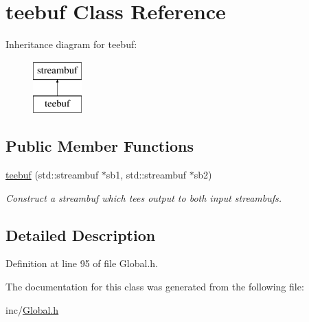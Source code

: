 \hypertarget{classteebuf}{}\section{teebuf Class Reference}
\label{classteebuf}
Inheritance diagram for teebuf\+:\begin{figure}[H]
\begin{center}
\leavevmode
\includegraphics[height=2.000000cm]{classteebuf}
\end{center}
\end{figure}
\subsection*{Public Member Functions}
\begin{DoxyCompactItemize}
\item 
\hypertarget{classteebuf_a874f4618a07d33370216658636c23558}{}\hyperlink{classteebuf_a874f4618a07d33370216658636c23558}{teebuf} (std\+::streambuf $\ast$sb1, std\+::streambuf $\ast$sb2)\label{classteebuf_a874f4618a07d33370216658636c23558}

\begin{DoxyCompactList}\small\item\em Construct a streambuf which tees output to both input streambufs. \end{DoxyCompactList}\end{DoxyCompactItemize}


\subsection{Detailed Description}


Definition at line 95 of file Global.\+h.



The documentation for this class was generated from the following file\+:\begin{DoxyCompactItemize}
\item 
inc/\hyperlink{Global_8h}{Global.\+h}\end{DoxyCompactItemize}
